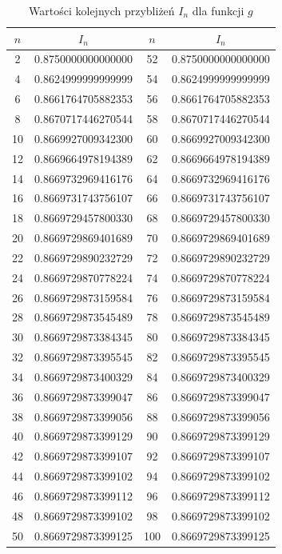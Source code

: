 \documentclass{article}
\begin{document}
    \begin{table}[htb]
      \centering
      \caption{Wartości kolejnych przybliżeń $I_n$ dla funkcji $g$}
      \label{tab:g}
      \begin{tabular}{|c|c|c|c|}
        \hline
        $n$ & $I_n$              & $n$ & $I_n$              \\ \hline
          2 & 0.8750000000000000 &  52 & 0.8750000000000000 \\
          4 & 0.8624999999999999 &  54 & 0.8624999999999999 \\
          6 & 0.8661764705882353 &  56 & 0.8661764705882353 \\
          8 & 0.8670717446270544 &  58 & 0.8670717446270544 \\
         10 & 0.8669927009342300 &  60 & 0.8669927009342300 \\
         12 & 0.8669664978194389 &  62 & 0.8669664978194389 \\
         14 & 0.8669732969416176 &  64 & 0.8669732969416176 \\
         16 & 0.8669731743756107 &  66 & 0.8669731743756107 \\
         18 & 0.8669729457800330 &  68 & 0.8669729457800330 \\
         20 & 0.8669729869401689 &  70 & 0.8669729869401689 \\
         22 & 0.8669729890232729 &  72 & 0.8669729890232729 \\
         24 & 0.8669729870778224 &  74 & 0.8669729870778224 \\
         26 & 0.8669729873159584 &  76 & 0.8669729873159584 \\
         28 & 0.8669729873545489 &  78 & 0.8669729873545489 \\
         30 & 0.8669729873384345 &  80 & 0.8669729873384345 \\
         32 & 0.8669729873395545 &  82 & 0.8669729873395545 \\
         34 & 0.8669729873400329 &  84 & 0.8669729873400329 \\
         36 & 0.8669729873399047 &  86 & 0.8669729873399047 \\
         38 & 0.8669729873399056 &  88 & 0.8669729873399056 \\
         40 & 0.8669729873399129 &  90 & 0.8669729873399129 \\
         42 & 0.8669729873399107 &  92 & 0.8669729873399107 \\
         44 & 0.8669729873399102 &  94 & 0.8669729873399102 \\
         46 & 0.8669729873399112 &  96 & 0.8669729873399112 \\
         48 & 0.8669729873399102 &  98 & 0.8669729873399102 \\
         50 & 0.8669729873399125 & 100 & 0.8669729873399125 \\ \hline
      \end{tabular}
    \end{table}
\end{document}
